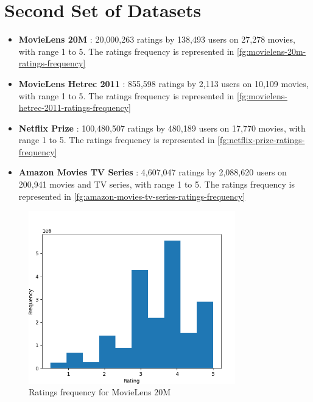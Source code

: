 \clearpage



\section{Second Set of Datasets}
\label{sc:second-set-datasets}

\begin{itemize}
\item \textbf{MovieLens 20M} \cite{movielens-20m-dataset}: 20,000,263 ratings by 138,493 users on 27,278 movies, with range 1 to 5. The ratings frequency is represented in \autoref{fg:movielens-20m-ratings-frequency}
\item \textbf{MovieLens Hetrec 2011} \cite{grouplens, hetrec-2011}: 855,598 ratings by 2,113 users on 10,109 movies, with range 1 to 5. The ratings frequency is represented in \autoref{fg:movielens-hetrec-2011-ratings-frequency}
\item \textbf{Netflix Prize} \cite{netflix-prize-dataset, 10.1145/1864708.1864721}: 100,480,507 ratings by 480,189 users on 17,770 movies, with range 1 to 5. The ratings frequency is represented in \autoref{fg:netflix-prize-ratings-frequency}
\item \textbf{Amazon Movies TV Series} \cite{amazon-movies-tv-series-dataset}: 4,607,047 ratings by 2,088,620 users on 200,941 movies and TV series, with range 1 to 5. The ratings frequency is represented in \autoref{fg:amazon-movies-tv-series-ratings-frequency}
\end{itemize}
\begin{figure}[hbt!]
\centering
\includegraphics[width=0.8\textwidth]{pictures/movielens-20m-ratings-frequency}
\caption{Ratings frequency for MovieLens 20M}
\label{fg:movielens-20m-ratings-frequency}
\end{figure}
